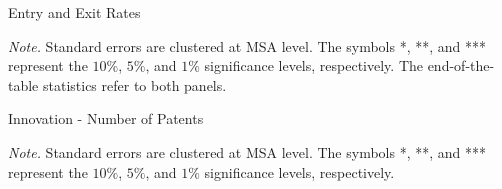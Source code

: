 \documentclass[dv_diss_main.tex]{subfiles}
\begin{document}
\begin{table}[H]
    \begin{center}
    \caption{Entry and Exit Rates}
    \label{tab:entry_rate}
	\resizebox{!}{!}{
    
    }
    \end{center}
    \footnotesize{\textit{Note. } Standard errors are clustered at MSA level. The symbols *, **, and *** represent the $10\%$, $5\%$, and $1\%$ significance levels, respectively. The end-of-the-table statistics refer to both panels.}
\end{table}

\newpage

\begin{table}[H]
    \begin{center}
    \caption{Innovation - Number of Patents}
    \label{tab:patent}
	\resizebox{!}{!}{
    
    }
    \end{center}
    
    \footnotesize{\textit{Note.} Standard errors are clustered at MSA level. The symbols *, **, and *** represent the $10\%$, $5\%$, and $1\%$ significance levels, respectively.}
        
    
\end{table}




\end{document}
